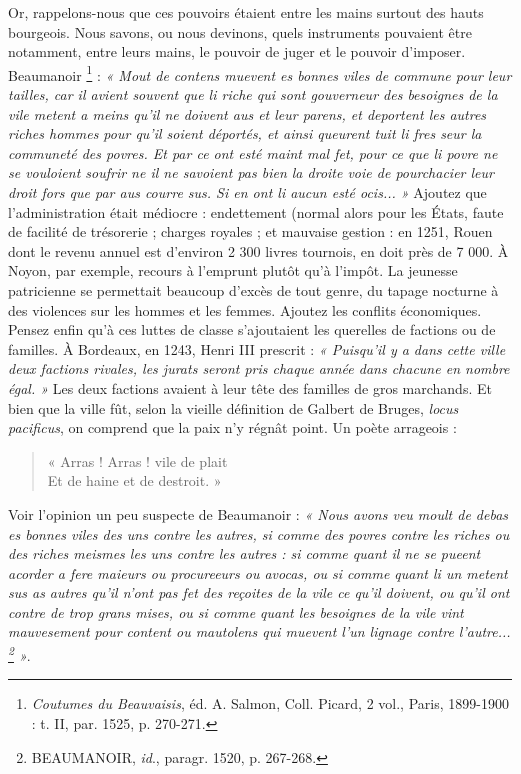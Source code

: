 \documentclass[french,twoside]{book} %
\begin{document}
Or, rappelons-nous que ces pouvoirs étaient entre les mains surtout des hauts bourgeois. Nous savons, ou nous devinons, quels instruments pouvaient être notamment, entre leurs mains, le pouvoir de juger et le pouvoir d’imposer. Beaumanoir \footnote{{\itshape Coutumes du Beauvaisis}, éd. A. Salmon, Coll. Picard, 2 vol., Paris, 1899-1900 : t. II, par. 1525, p. 270-271.} : \emph{« Mout de contens muevent es bonnes viles de commune pour leur tailles, car il avient souvent que li riche qui sont gouverneur des besoignes de la vile metent a meins qu’il ne doivent aus et leur parens, et  
\label{p77} deportent les autres riches hommes pour qu’il soient déportés, et ainsi queurent tuit li fres seur la communeté des povres. Et par ce ont esté maint mal fet, pour ce que li povre ne se vouloient soufrir ne il ne savoient pas bien la droite voie de pourchacier leur droit fors que par aus courre sus. Si en ont li aucun esté ocis... »} Ajoutez que l’administration était médiocre : endettement (normal alors pour les États, faute de facilité de trésorerie ; charges royales ; et mauvaise gestion : en 1251, Rouen dont le revenu annuel est d’environ 2 300 livres tournois, en doit près de 7 000. À Noyon, par exemple, recours à l’emprunt plutôt qu’à l’impôt. La jeunesse patricienne se permettait beaucoup d’excès de tout genre, du tapage nocturne à des violences sur les hommes et les femmes. Ajoutez les conflits économiques. Pensez enfin qu’à ces luttes de classe s’ajoutaient les querelles de factions ou de familles. À Bordeaux, en 1243, Henri III prescrit : \emph{« Puisqu’il y a dans cette ville deux factions rivales, les jurats seront pris chaque année dans chacune en nombre égal. »} Les deux factions avaient à leur tête des familles de gros marchands. Et bien que la ville fût, selon la vieille définition de Galbert de Bruges, \emph{locus pacificus}, on comprend que la paix n’y régnât point. Un poète arrageois :\par


\begin{verse}
« Arras ! Arras ! vile de plait\\
Et de haine et de destroit. »\\
\end{verse}

\noindent Voir l’opinion un peu suspecte de Beaumanoir : \emph{« Nous avons veu moult de debas es bonnes viles des uns contre les autres, si comme des povres contre les riches ou des riches meismes les uns contre les autres : si comme quant il ne se pueent acorder a fere maieurs ou procureeurs ou avocas, ou si comme quant li un metent sus as autres qu’il n’ont pas fet des reçoites de la vile ce qu’il doivent, ou qu’il ont contre de trop grans mises, ou si comme quant les besoignes de la vile vint mauvesement pour content ou mautolens qui muevent l’un lignage contre l’autre... \footnote{ BEAUMANOIR, {\itshape id}., paragr. 1520, p. 267-268.} »}.
\end{document}
